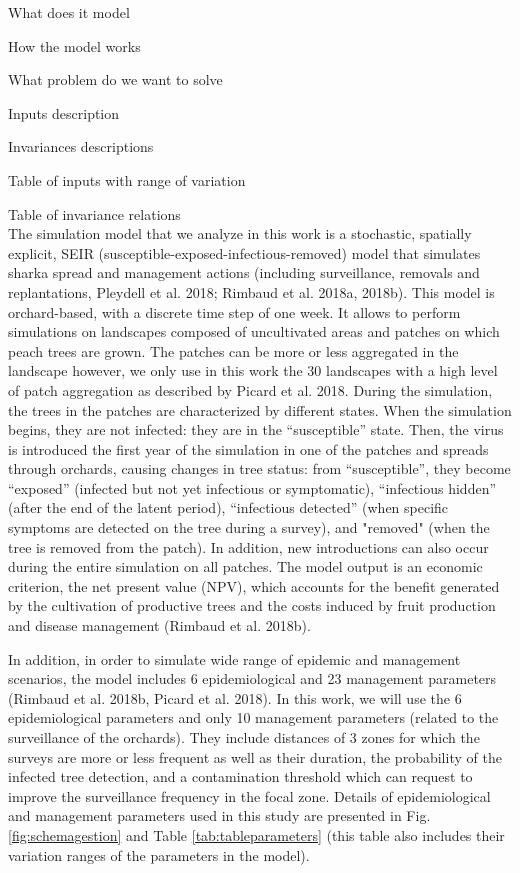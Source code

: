 What does it model

How the model works

What problem do we want to solve

Inputs description

Invariances descriptions

Table of inputs with range of variation

Table of invariance relations
\\

The simulation model that we analyze in this work is a stochastic, spatially explicit, SEIR (susceptible-exposed-infectious-removed) model that simulates sharka spread and management actions (including surveillance, removals and replantations, Pleydell et al. 2018; Rimbaud et al. 2018a, 2018b).
This model is orchard-based, with a discrete time step of one week. It allows to perform simulations on landscapes composed of uncultivated areas and patches on which peach trees are grown. The patches can be more or less aggregated in the landscape however, we only use in this work the 30 landscapes with a high level of patch aggregation as described by Picard et al. 2018. During the simulation, the trees in the patches are characterized by different states. When the simulation begins, they are not infected: they are in the “susceptible” state. Then, the virus is introduced the first year of the simulation in one of the patches and spreads through orchards, causing changes in tree status: from “susceptible”, they become “exposed” (infected but not yet infectious or symptomatic), “infectious hidden” (after the end of the latent period), “infectious detected” (when specific symptoms are detected on the tree during a survey), and "removed" (when the tree is removed from the patch). In addition, new introductions can also occur during the entire simulation on all patches.
The model output is an economic criterion, the net present value (NPV), which accounts for the benefit generated by the cultivation of productive trees and the costs induced by fruit production and disease management (Rimbaud et al. 2018b).

In addition, in order to simulate wide range of epidemic and management scenarios, the model includes 6 epidemiological and 23 management parameters (Rimbaud et al. 2018b, Picard et al. 2018). In this work, we will use the 6 epidemiological parameters and only 10 management parameters (related to the surveillance of the orchards). They include distances of 3 zones for which the surveys are more or less frequent as well as their duration, the probability of the infected tree detection, and a contamination threshold which can request to improve the surveillance frequency in the focal zone. Details of epidemiological and management parameters used in this study are presented in Fig.\ref{fig:schemagestion} and Table \ref{tab:tableparameters} (this table also includes their variation ranges of the parameters in the model).

